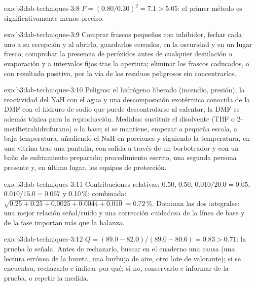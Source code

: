 \begin{solution}{exo:b3:lab-techniques-3:8}
$F = (0.80/0.30)^2 = 7.1 > 5.05$: el primer método es significativamente menos preciso.
\end{solution}

\begin{solution}{exo:b3:lab-techniques-3:9}
Comprar frascos pequeños con inhibidor, fechar cada uno a su recepción y al abrirlo, guardarlos
cerrados, en la oscuridad y en un lugar fresco; comprobar la presencia de peróxidos antes de cualquier destilación o evaporación
y a intervalos fijos tras la apertura; eliminar los frascos caducados, o con resultado
positivo, por la vía de los residuos peligrosos sin concentrarlos.
\end{solution}

\begin{solution}{exo:b3:lab-techniques-3:10}
Peligros: el hidrógeno liberado (incendio, presión), la reactividad del NaH con el agua
y una descomposición exotérmica conocida de la DMF con el hidruro de sodio que puede descontrolarse
al calentar; la DMF es además tóxica para la reproducción. Medidas: sustituir el disolvente
(THF o 2-metiltetrahidrofurano) o la base; si se mantiene, empezar a pequeña escala, a baja
temperatura, añadiendo el NaH en porciones y siguiendo la temperatura, en una vitrina
tras una pantalla, con salida a través de un borboteador y con un baño de enfriamiento preparado; procedimiento
escrito, una segunda persona presente y, en último lugar, los equipos de protección.
\end{solution}

\begin{solution}{exo:b3:lab-techniques-3:11}
Contribuciones relativas: 0.50, 0.50, $0.010/20.0 = 0.05$, $0.010/15.0 = 0.067$ y 0.10\,\%; combinada:
$\sqrt{0.25 + 0.25 + 0.0025 + 0.0044 + 0.010} = 0.72$\,\%. Dominan las dos integrales: una mejor relación señal/ruido y
una corrección cuidadosa de la línea de base y de la fase importan más que la balanza.
\end{solution}

\begin{solution}{exo:b3:lab-techniques-3:12}
$Q = (89.0 - 82.0)/(89.0 - 80.6) = 0.83 > 0.71$: la prueba lo señala. Antes de rechazarlo, buscar en el cuaderno
una causa (una lectura errónea de la bureta, una burbuja de aire, otro lote de valorante); si se
encuentra, rechazarlo e indicar por qué; si no, conservarlo e informar de la prueba, o repetir la
medida.
\end{solution}

